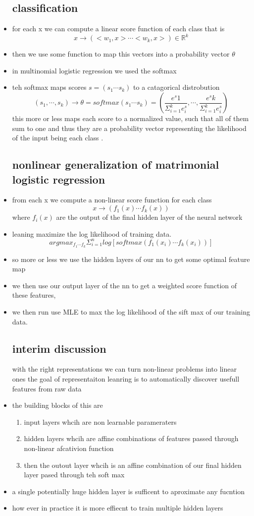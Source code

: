 \documentclass{article}
\begin{document}
\begin{itemize}
\subsection{classification}
\item for each x we can compute a linear score function of each class that is $$x\rightarrow (<w_1,x>\cdots <w_k,x>)\in \mathbb{R}^{k}$$ 
\item then we use some function to map this vectors into a probability vector $\theta$
\item in multinomial logistic regression we used the softmax
\item teh softmax maps scores $s=(s_1\cdots s_k)$ to a catagorical distrobution$$ (s_1,\cdots , s_k)\rightarrow \theta = softmax(s_1\cdots s_k)=(\frac{e^s1}{\Sigma_{i=1}^{k}e^s_i},\cdots, \frac{e^sk}{\Sigma_{i=1}^{k}e^s_i}  )$$
this more or less maps each score to a normalized value, such that all of them sum to one and thus they are a probability vector representing the likelihood of the input being each class .
\subsection{nonlinear generalization of matrimonial logistic regression}
\item from each x we compute a non-linear  score function for each class $$x\rightarrow (f_1(x)\cdots f_k(x))$$
where $f_i(x)$ are the output of the final hidden layer of the neural network 
\item leaning maximize the log likelihood of training data. $$argmax_{f_1\cdots f_k}\Sigma_{i=1}^{n}log[softmax(f_1(x_i)\cdots f_k(x_i))]$$
\item so more or less we use the hidden layers of our nn to get some optimal feature map 
\item we then use our output layer of the nn to get a weighted score function of these features, 
\item we then run use MLE to max the log likelihood of the sift max of our training data. 
\subsection{interim discussion}
\itme with the right representations we can turn non-linear problems into linear ones 
\itme the goal of representaiton leanring is to automatically discover usefull features from raw data 
\item the building blocks of this are 
\begin{enumerate}
    \item input layers whcih are non learnable parameraters
    \item hidden layers whcih are affine combinations of features passed through non-linear afcativion function 
    \item then the outout layer whcih is an affine combination of our final hidden layer pased through teh soft max 
\end{enumerate}
\item a single potentially huge hidden layer is sufficent to aproximate any fucntion 
\item how ever in practice it is more effiecnt to train multiple hidden layers

\end{itemize}
\end{document}

